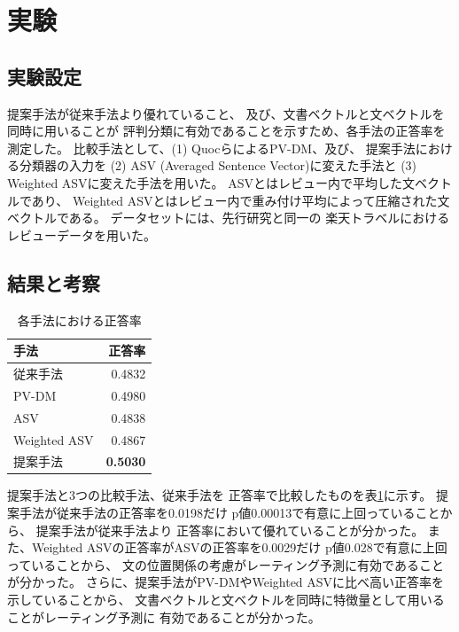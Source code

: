 \documentclass{ttisummary}
\begin{document}
\section{実験}

\subsection{実験設定}

提案手法が従来手法より優れていること、
及び、文書ベクトルと文ベクトルを同時に用いることが
評判分類に有効であることを示すため、各手法の正答率を測定した。
比較手法として、(1) Quocら\cite{quoc14}によるPV-DM、及び、
提案手法における分類器の入力を
(2) ASV (Averaged Sentence Vector)に変えた手法と
(3) Weighted ASVに変えた手法を用いた。
ASVとはレビュー内で平均した文ベクトルであり、
Weighted ASVとはレビュー内で重み付け平均によって圧縮された文ベクトルである。
データセットには、先行研究\cite{fujitani15}と同一の
楽天トラベルにおけるレビューデータを用いた。

\subsection{結果と考察}

\begin{table}[b!]
  \caption{各手法における正答率}
  \centering
  \begin{tabular}{l | r} \label{tab:Accuracies}
    手法 & 正答率 \\
    \hline
    従来手法\cite{fujitani15}  & 0.4832 \\
    PV-DM & 0.4980 \\
    ASV & 0.4838 \\
    Weighted ASV & 0.4867 \\
    提案手法 & \textbf{0.5030} \\
  \end{tabular}
\end{table}

提案手法と3つの比較手法、従来手法\cite{fujitani15}を
正答率で比較したものを表\ref{tab:Accuracies}に示す。
提案手法が従来手法\cite{fujitani15}の正答率を0.0198だけ
p値0.00013で有意に上回っていることから、
提案手法が従来手法\cite{fujitani15}より
正答率において優れていることが分かった。
また、Weighted ASVの正答率がASVの正答率を0.0029だけ
p値0.028で有意に上回っていることから、
文の位置関係の考慮がレーティング予測に有効であることが分かった。
さらに、提案手法がPV-DMやWeighted ASVに比べ高い正答率を示していることから、
文書ベクトルと文ベクトルを同時に特徴量として用いることがレーティング予測に
有効であることが分かった。
\end{document}
